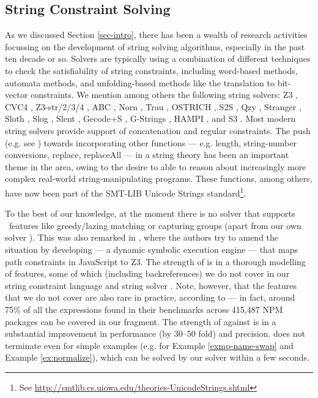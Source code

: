 \subsection{String Constraint Solving}
As we discussed Section \ref{sec-intro}, there has been a wealth of research
activities focussing on the development of string solving algorithms, especially
in the past ten decade or so. Solvers are typically using a combination
of different techniques to check the satisfiability of string constraints,
including word-based methods, automata methods, and unfolding-based methods
like the translation to bit-vector constraints.
We mention among others the following string solvers:
Z3 \cite{Z3}, CVC4 \cite{cvc4}, Z3-str/2/3/4 \cite{Z3-str,Z3-str2,Z3-str3,BerzishMurphy2021},
 ABC \cite{ABC}, Norn
\cite{Abdulla14}, Trau \cite{Z3-trau,AbdullaACDHRR18-trau,Abdulla17}, OSTRICH
\cite{CHL+19}, S2S \cite{DBLP:conf/aplas/LeH18}, Qzy \cite{cox2017model}, Stranger \cite{Stranger}, Sloth
\cite{HJLRV18,AbdullaA+19},
Slog \cite{fang-yu-circuits}, Slent \cite{WC+18}, Gecode+S \cite{DBLP:conf/cpaior/ScottFPS17}, G-Strings \cite{DBLP:conf/cp/AmadiniGST17}, HAMPI
\cite{HAMPI}, and S3 \cite{S3}. 
Most modern string solvers provide support of concatenation and regular 
constraints. The push (e.g. see
\cite{GB16,Vijay-length,HAMPI,Berkeley-JavaScript,LB16,S3})
towards incorporating other functions --- e.g. length, 
string-number conversions, replace, replaceAll --- in a string theory has been an
important theme in the area, owing to the desire to able to reason 
about increasingly more complex real-world string-manipulating programs.
These functions, among others, have now been part of the SMT-LIB Unicode Strings
standard\footnote{See
\url{http://smtlib.cs.uiowa.edu/theories-UnicodeStrings.shtml}}. 

To the best of our knowledge, at the moment there is no solver that
supports \regexp\ features like greedy/lazing matching or capturing
groups (apart from our own solver \ostrich). This was also remarked in
\cite{LMK19}, where the authors try to amend the situation by developing 
\expose{} --- a dynamic symbolic execution engine --- that maps path 
constraints in JavaScript to Z3. The strength of \expose{} is in a thorough
modelling of \regexp{} features, some of which (including backreferences) we do 
not cover in our string constraint language and string solver \ostrich{}. Note, however,
that the features that we do not cover are also rare in practice, according to
\cite{LMK19} --- in fact, around 75\% of all the \regexp{} expressions found in
their benchmarks across 415,487 NPM packages can be covered in our fragment.
The strength of \ostrich{} against \expose{} is in a substantial improvement in
performance (by 30--50 fold) and precision. \expose{} does not terminate 
even for simple examples (e.g. for Example \ref{exmp-name-swap} and Example 
\ref{ex:normalize}), which can be solved by our solver within a few seconds.

